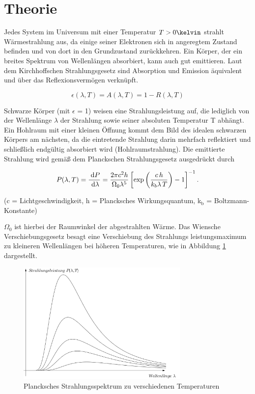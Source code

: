 
\section{Theorie}
Jedes System im Universum mit einer Temperatur $T > 0 \kelvin $ strahlt Wärmestrahlung aus, da einige seiner Elektronen sich in angeregtem
Zustand befinden und von dort in den Grundzustand zurückkehren. Ein Körper, der ein breites Spektrum von Wellenlängen absorbiert, kann auch gut emittieren. Laut dem
Kirchhoffschen Strahlungsgesetz sind Absorption und Emission äquivalent und über das Reflexionsvermögen verknüpft.

\begin{equation}
 \epsilon(\lambda,T) = A(\lambda,T) = 1 - R(\lambda,T)
 \label{Kirch}
\end{equation}

Schwarze Körper (mit $\epsilon$ = 1) weisen eine Strahlungsleistung auf, die lediglich von der Wellenlänge $\lambda$ der Strahlung sowie 
seiner absoluten Temperatur T abhängt. Ein Hohlraum mit einer kleinen Öffnung kommt dem Bild des idealen schwarzen Körpers am nächsten,
da die eintretende Strahlung darin mehrfach reflektiert und schließlich endgültig absorbiert wird (Hohlraumstrahlung). Die emittierte
Strahlung wird gemäß dem Planckschen Strahlungsgesetz ausgedrückt durch

\begin{formel}
\begin{equation}
P(\lambda,T) = \frac{\; \mathrm{d} P}{\; \mathrm{d} \lambda} = \frac{2 \pi c^2 h}{\Omega_0 \lambda^5} \left[ \exp \left(\frac{c\, h}{k_b \lambda \, T}\right) -1 \right]^{-1} .
\end{equation}
\caption*{\small{(c = Lichtgeschwindigkeit, h = Plancksches Wirkungsquantum, k$_\text{b}$ = Boltzmann-Konstante)}}
\label{Planck}
\end{formel}

$\Omega_0$ ist hierbei der Raumwinkel der abgestrahlten Wärme. Das Wiensche Verschiebungsgesetz besagt eine Verschiebung des Strahlungs
leistungsmaximum zu kleineren Wellenlängen bei höheren Temperaturen, wie in Abbildung \ref{Spektrum} dargestellt.

\begin{figure}[H]
 \includegraphics[width=0.75\textwidth]{pics/207a.png}
 \centering
 \caption{Plancksches Strahlungsspektrum zu verschiedenen Temperaturen}
 \label{Spektrum}
\end{figure}

